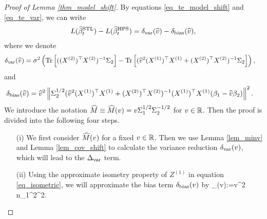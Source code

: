 \begin{proof}[Proof of Lemma \ref{thm_model_shift}]
By equations \eqref{eq_te_model_shift} and \eqref{eq_te_var}, we can write
\begin{align*}
L(\widehat{\beta}_t^{\textup{STL}}) - L(\widehat{\beta}_t^{\textup{HPS}})=\delta_{\text{var}}(\widehat v) - \delta_{\text{bias}}(\widehat v),
\end{align*}
where we denote
\begin{align*}
\delta_{\text{var}}(\widehat v)&=\sigma^2 \left(  \operatorname{Tr}\left[((X^{(2)})^{\top}X^{(2)})^{-1}\Sigma_2\right] -  \operatorname{Tr}\left[( \widehat{v}^2 (X^{(1)})^{\top}X^{(1)} + (X^{(2)})^{\top}X^{(2)})^{-1} \Sigma_2\right]\right),
\end{align*}
and
\begin{align}\label{revise_deltabias}
 \delta_{\text{bias}}(\widehat v)&= \widehat{v}^2 \left\| \Sigma_2^{1/2}(\widehat{v}^2 (X^{(1)})^{\top}X^{(1)} + (X^{(2)})^{\top}X^{(2)})^{-1} (X^{(1)})^{\top}X^{(1)} (\beta_1 - \widehat{v} \beta_2) \right\|^2.
\end{align}
We introduce the notation $\widehat M \equiv \widehat M(v)= v\Sigma_1^{1/2}\Sigma_2^{-1/2}$ for $v\in \mathbb{R}$. Then the proof is divided into the following four steps.
\begin{itemize}
\item[(i)] We first consider $ \widehat M(v)$ for a fixed $v\in \mathbb{R}$. Then we use Lemma \ref{lem_minv} and Lemma \ref{lem_cov_shift} to calculate the variance reduction $\delta_{\text{var}}(v)$, which will lead to the $\Delta_{\text{var}}$ term.

\item[(ii)] Using the approximate isometry property of $Z^{(1)}$ in equation \eqref{eq_isometric}, we will approximate the bias term $ \delta_{\text{bias}}(v)$ by
\be\label{deltabetapf}
\wt\delta_{\bias}(v):={v}^2 n_1^2^2.\ee


\end{itemize}
\end{proof}
